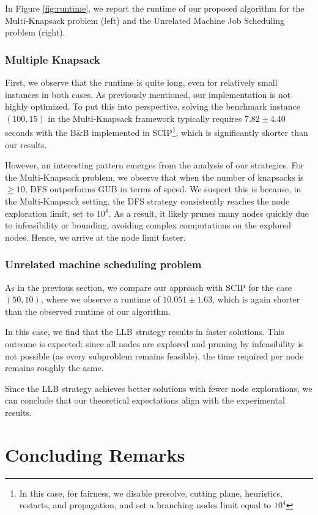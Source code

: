 \documentclass[a4paper,UKenglish,cleveref, autoref, thm-restate, pdfa]{lipics-v2021}
\theoremstyle{plain}
\begin{document}
In Figure \ref{fig:runtime}, we report the runtime of our proposed algorithm for the Multi-Knapsack problem (left) and the Unrelated Machine Job Scheduling problem (right).  

\subsubsection{Multiple Knapsack}  
First, we observe that the runtime is quite long, even for relatively small instances in both cases.  
As previously mentioned, our implementation is not highly optimized.  
To put this into perspective, solving the benchmark instance $(100, 15)$ in the Multi-Knapsack framework typically requires $7.82 \pm 4.40$ seconds with the B\&B implemented in SCIP\footnote{In this case, for fairness, we disable presolve, cutting plane, heuristics, restarts, and propagation, and set a branching nodes limit equal to $10^4$}, which is significantly shorter than our results.

However, an interesting pattern emerges from the analysis of our strategies.  
For the Multi-Knapsack problem, we observe that when the number of knapsacks is $\geq 10$, DFS outperforms GUB in terms of speed.  
We suspect this is because, in the Multi-Knapsack setting, the DFS strategy consistently reaches the node exploration limit, set to $10^4$.  
As a result, it likely prunes many nodes quickly due to infeasibility or bounding, avoiding complex computations on the explored nodes. Hence, we arrive at the node limit faster. 

\subsubsection{Unrelated machine scheduling problem}
As in the previous section, we compare our approach with SCIP for the case $(50, 10)$, where we observe a runtime of $10.051\pm 1.63$, which is again shorter than the observed runtime of our algorithm.  

In this case, we find that the LLB strategy results in faster solutions.  
This outcome is expected: since all nodes are explored and pruning by infeasibility is not possible (as every subproblem remains feasible), the time required per node remains roughly the same.  

Since the LLB strategy achieves better solutions with fewer node explorations, we can conclude that our theoretical expectations align with the experimental results. 
\section{Concluding Remarks}\label{sec:conc}
\end{document}
